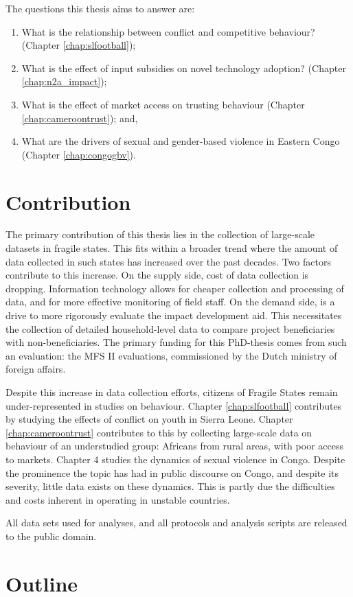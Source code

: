 The questions this thesis aims to answer are:
\begin{enumerate}
	\item What is the relationship between conflict and competitive behaviour? (Chapter \ref{chap:slfootball});
	\item What is the effect of input subsidies on novel technology adoption? (Chapter \ref{chap:n2a_impact});
	\item What is the effect of market access on trusting behaviour (Chapter \ref{chap:cameroontrust}); and,
	\item What are the drivers of sexual and gender-based violence in Eastern Congo (Chapter \ref{chap:congogbv}).
\end{enumerate}

\section{Contribution}
The primary contribution of this thesis lies in the collection of large-scale datasets in fragile states. This fits within a broader trend where the amount of data collected in such states has increased over the past decades. Two factors contribute to this increase. On the supply side, cost of data collection is dropping. Information technology allows for cheaper collection and processing of data, and for more effective monitoring of field staff. On the demand side, is a drive to more rigorously evaluate the impact development aid. This necessitates the collection of detailed household-level data to compare project beneficiaries with non-beneficiaries. The primary funding for this PhD-thesis comes from such an evaluation: the MFS II evaluations, commissioned by the Dutch ministry of foreign affairs.

Despite this increase in data collection efforts, citizens of Fragile States remain under-represented in studies on behaviour. Chapter \ref{chap:slfootball} contributes by studying the effects of conflict on youth in Sierra Leone. Chapter \ref{chap:cameroontrust} contributes to this by collecting large-scale data on behaviour of an understudied group: Africans from rural areas, with poor access to markets. Chapter 4 studies the dynamics of sexual violence in Congo. Despite the prominence the topic has had in public discourse on Congo, and despite its severity, little data exists on these dynamics. This is partly due the difficulties and costs inherent in operating in unstable countries.

All data sets used for analyses, and all protocols and analysis scripts are released to the public domain.


\section{Outline}


\clearpage 

